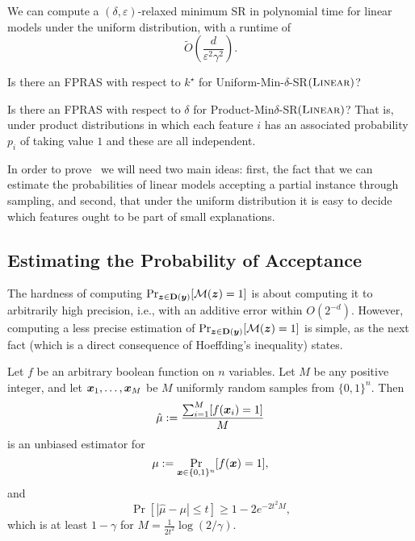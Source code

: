 \begin{theorem}\label{thm:delta-relaxed}
    We can compute a $(\delta, \varepsilon)$-relaxed minimum SR in polynomial time for linear models under the uniform distribution, with a runtime of 
    \[ 
        \tilde{O}\left(\frac{d}{\varepsilon^2\gamma^2}\right).
    \]
\end{theorem}

\begin{open}
    Is there an FPRAS with respect to $k^\star$ for  Uniform-Min-$\delta$-SR$(\textsc{Linear})$?
\end{open}

\begin{open}
    Is there an FPRAS with respect to $\delta$ for Product-Min$\delta$-SR$(\textsc{Linear})$? That is, under product distributions in which each feature $i$ has an associated probability $p_i$ of taking value $1$ and these are all independent.
\end{open}


In order to prove~ we will need two main ideas: first, the fact that we can estimate the probabilities of linear models accepting a partial instance through sampling, and second, that under the uniform distribution it is easy to decide which features ought to be part of small explanations.

\subsection{Estimating the Probability of Acceptance}
 The  hardness of computing
$\Pr_{{\bm{z}}  \in \mathbf{D}({\bm{y}})}[\mathcal{M}({\bm{z}}) = 1]$ is about computing it to arbitrarily high precision, i.e., with an additive error within $O(2^{-d})$. However, computing a less precise estimation of $\Pr_{{\bm{z}} \in \mathbf{D}({\bm{y}})}[\mathcal{M}({\bm{z}}) = 1]$ is simple, as the next fact (which is a direct consequence of Hoeffding's inequality)  states.

\begin{fact}\label{fact:hoeffding}
    Let $f$ be an arbitrary boolean function on $n$ variables. Let $M$ be any positive integer,
    and let ${\bm{x}}_1, \ldots, {\bm{x}}_M$ be $M$ uniformly random samples from $\{0, 1\}^n$. Then 
    \[
        \hat{\mu} := \frac{\sum_{i=1}^M [f({\bm{x}}_i) = 1]}{M}
    \]
    is an unbiased estimator for 
    \[
        \mu := \Pr_{{\bm{x}} \in \{0, 1\}^n}[f({\bm{x}}) = 1],
    \]
    and 
    \[
    \Pr[\left|\hat{\mu} - \mu \right| \leq t] \geq 1 - 2e^{-2t^2 M},
    \]
    which is at least $1 - \gamma$ for $M = \frac{1}{2t^2} \log(2/\gamma)$.
\end{fact}

